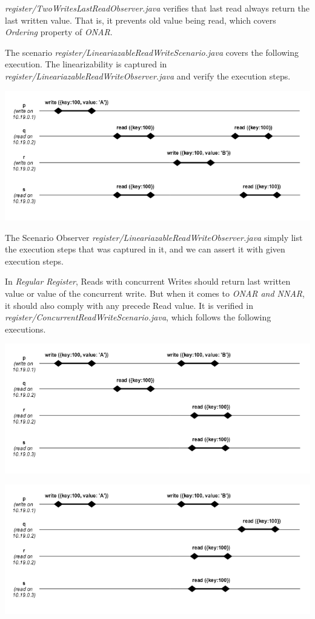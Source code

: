 \documentclass[a4paper, 11pt]{article}
\begin{document}
\textit{register/TwoWritesLastReadObserver.java} verifies that last read always return the last written value. That is, it prevents old value being read, which covers \textit{Ordering} property of \textit{ONAR}.

The scenario \textit{register/LineariazableReadWriteScenario.java} covers the following execution. The linearizability is captured in \textit{register/LineariazableReadWriteObserver.java} and verify the execution steps.

{\centering\includegraphics[scale = 0.5]{./images/mwriters_read.png}\par}

The Scenario Observer \textit{register/LineariazableReadWriteObserver.java} simply list the execution steps that was captured in it, and we can assert it with given execution steps.

In \textit{Regular Register}, Reads with concurrent Writes should return last written value or value of the concurrent write. But when it comes to \textit{ONAR and NNAR}, it should also comply with any precede Read value. It is verified in \textit{register/ConcurrentReadWriteScenario.java}, which follows the following executions.

{\centering\includegraphics[scale = 0.5]{./images/concurent_read_write.png}\par}

{\centering\includegraphics[scale = 0.5]{./images/concurent_read_write2.png}\par}
\end{document}
